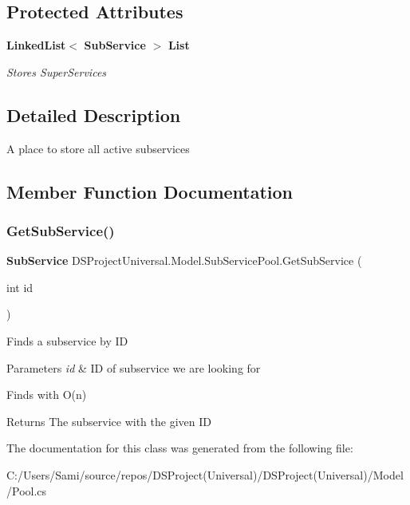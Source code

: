 \subsection*{Protected Attributes}
\begin{DoxyCompactItemize}
\item 
\mbox{\label{class_d_s_project_universal_1_1_model_1_1_sub_service_pool_ae35d08a93e4077d6c841152cf7052d55}} 
\textbf{ Linked\+List}$<$ \textbf{ Sub\+Service} $>$ \textbf{ List}
\begin{DoxyCompactList}\small\item\em Stores Super\+Services\end{DoxyCompactList}\end{DoxyCompactItemize}


\subsection{Detailed Description}
A place to store all active subservices

\subsection{Member Function Documentation}
\mbox{\label{class_d_s_project_universal_1_1_model_1_1_sub_service_pool_a3aefcae44f633d1c959fe6bd388c2ab8}} 
\subsubsection{Get\+Sub\+Service()}
{\footnotesize\ttfamily \textbf{ Sub\+Service} D\+S\+Project\+Universal.\+Model.\+Sub\+Service\+Pool.\+Get\+Sub\+Service (\begin{DoxyParamCaption}\item[{int}]{id }\end{DoxyParamCaption})}



Finds a subservice by ID


\begin{DoxyParams}{Parameters}
{\em id} & ID of subservice we are looking for\\
\hline
\end{DoxyParams}


Finds with O(n)

\begin{DoxyReturn}{Returns}
The subservice with the given ID
\end{DoxyReturn}


The documentation for this class was generated from the following file\+:\begin{DoxyCompactItemize}
\item 
C\+:/\+Users/\+Sami/source/repos/\+D\+S\+Project(\+Universal)/\+D\+S\+Project(\+Universal)/\+Model/Pool.\+cs\end{DoxyCompactItemize}

